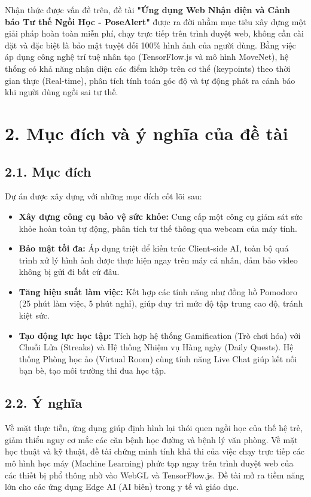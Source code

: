 \documentclass[12pt,a4paper]{report}
\begin{document}
Nhận thức được vấn đề trên, đề tài \textbf{"Ứng dụng Web Nhận diện và Cảnh báo Tư thế Ngồi Học - PoseAlert"} được ra đời nhằm mục tiêu xây dựng một giải pháp hoàn toàn miễn phí, chạy trực tiếp trên trình duyệt web, không cần cài đặt và đặc biệt là bảo mật tuyệt đối 100\% hình ảnh của người dùng. Bằng việc áp dụng công nghệ trí tuệ nhân tạo (TensorFlow.js và mô hình MoveNet), hệ thống có khả năng nhận diện các điểm khớp trên cơ thể (keypoints) theo thời gian thực (Real-time), phân tích tính toán góc độ và tự động phát ra cảnh báo khi người dùng ngồi sai tư thế.

\section*{2. Mục đích và ý nghĩa của đề tài}
\subsection*{2.1. Mục đích}
Dự án được xây dựng với những mục đích cốt lõi sau:
\begin{itemize}[leftmargin=*]
    \item \textbf{Xây dựng công cụ bảo vệ sức khỏe:} Cung cấp một công cụ giám sát sức khỏe hoàn toàn tự động, phân tích tư thế thông qua webcam của máy tính.
    \item \textbf{Bảo mật tối đa:} Áp dụng triệt để kiến trúc Client-side AI, toàn bộ quá trình xử lý hình ảnh được thực hiện ngay trên máy cá nhân, đảm bảo video không bị gửi đi bất cứ đâu.
    \item \textbf{Tăng hiệu suất làm việc:} Kết hợp các tính năng như đồng hồ Pomodoro (25 phút làm việc, 5 phút nghỉ), giúp duy trì mức độ tập trung cao độ, tránh kiệt sức.
    \item \textbf{Tạo động lực học tập:} Tích hợp hệ thống Gamification (Trò chơi hóa) với Chuỗi Lửa (Streaks) và Hệ thống Nhiệm vụ Hàng ngày (Daily Quests). Hệ thống Phòng học ảo (Virtual Room) cùng tính năng Live Chat giúp kết nối bạn bè, tạo môi trường thi đua học tập.
\end{itemize}

\subsection*{2.2. Ý nghĩa}
Về mặt thực tiễn, ứng dụng giúp định hình lại thói quen ngồi học của thế hệ trẻ, giảm thiểu nguy cơ mắc các căn bệnh học đường và bệnh lý văn phòng. Về mặt học thuật và kỹ thuật, đề tài chứng minh tính khả thi của việc chạy trực tiếp các mô hình học máy (Machine Learning) phức tạp ngay trên trình duyệt web của các thiết bị phổ thông nhờ vào WebGL và TensorFlow.js. Đề tài mở ra tiềm năng lớn cho các ứng dụng Edge AI (AI biên) trong y tế và giáo dục.
\end{document}
